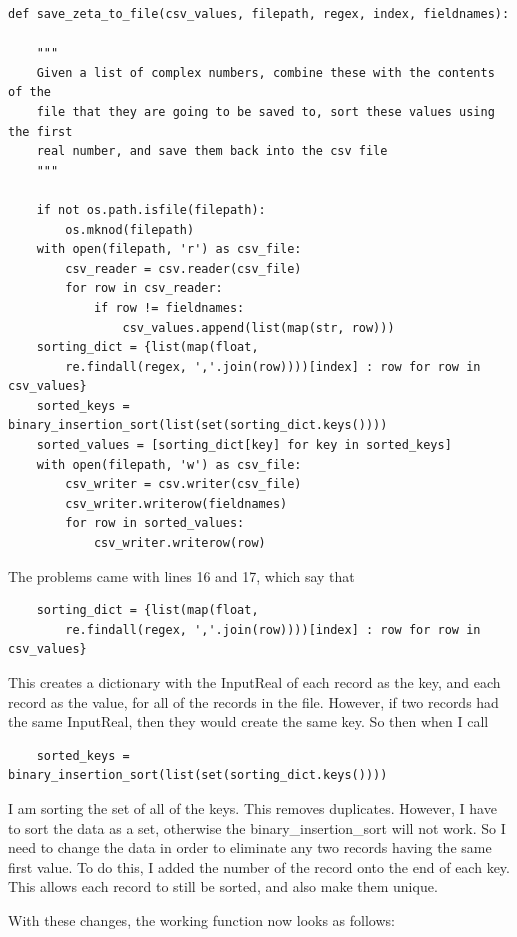 \documentclass{article}
\begin{document}
\begin{lstlisting}
def save_zeta_to_file(csv_values, filepath, regex, index, fieldnames):

    """
    Given a list of complex numbers, combine these with the contents of the
    file that they are going to be saved to, sort these values using the first
    real number, and save them back into the csv file
    """

    if not os.path.isfile(filepath):
        os.mknod(filepath)
    with open(filepath, 'r') as csv_file:
        csv_reader = csv.reader(csv_file)
        for row in csv_reader:
            if row != fieldnames:
                csv_values.append(list(map(str, row)))
    sorting_dict = {list(map(float,
        re.findall(regex, ','.join(row))))[index] : row for row in csv_values}
    sorted_keys = binary_insertion_sort(list(set(sorting_dict.keys())))
    sorted_values = [sorting_dict[key] for key in sorted_keys]
    with open(filepath, 'w') as csv_file:
        csv_writer = csv.writer(csv_file)
        csv_writer.writerow(fieldnames)
        for row in sorted_values:
            csv_writer.writerow(row)
\end{lstlisting}

The problems came with lines 16 and 17, which say that

\begin{lstlisting}
    sorting_dict = {list(map(float,
        re.findall(regex, ','.join(row))))[index] : row for row in csv_values}
\end{lstlisting}

This creates a dictionary with the InputReal of each record as the key, and each record as the value, for all of the records in the file. However, if two records had the same InputReal, then they would create the same key. So then when I call

\begin{lstlisting}
    sorted_keys = binary_insertion_sort(list(set(sorting_dict.keys())))
\end{lstlisting}

I am sorting the set of all of the keys. This removes duplicates. However, I have to sort the data as a set, otherwise the binary\_insertion\_sort will not work. So I need to change the data in order to eliminate any two records having the same first value. To do this, I added the number of the record onto the end of each key. This allows each record to still be sorted, and also make them unique.

With these changes, the working function now looks as follows:
\end{document}
